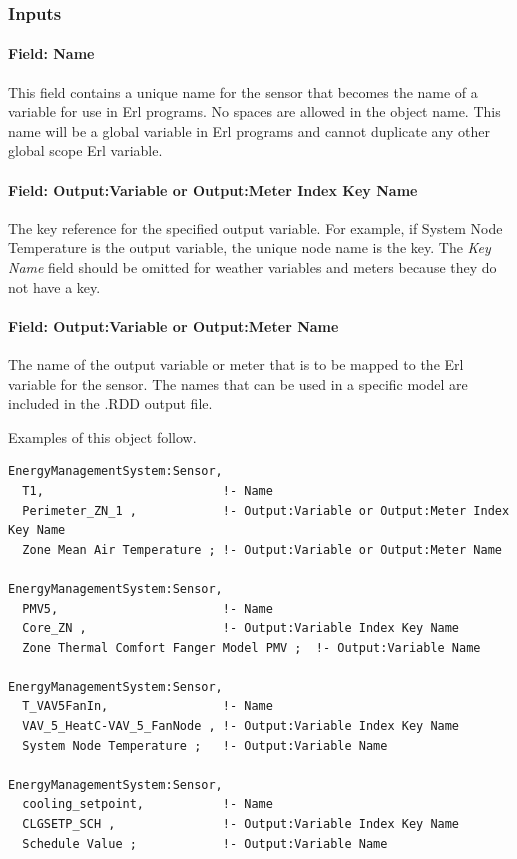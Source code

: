 \subsubsection{Inputs}\label{inputs-015}

\paragraph{Field: Name}\label{field-name-014}

This field contains a unique name for the sensor that becomes the name of a variable for use in Erl programs. No spaces are allowed in the object name. This name will be a global variable in Erl programs and cannot duplicate any other global scope Erl variable.

\paragraph{Field: Output:Variable or Output:Meter Index Key Name}\label{field-outputvariable-or-outputmeter-index-key-name}

The key reference for the specified output variable. For example, if System Node Temperature is the output variable, the unique node name is the key. The \emph{Key Name} field should be omitted for weather variables and meters because they do not have a key.

\paragraph{Field: Output:Variable or Output:Meter Name}\label{field-outputvariable-or-outputmeter-name}

The name of the output variable or meter that is to be mapped to the Erl variable for the sensor. The names that can be used in a specific model are included in the .RDD output file.

Examples of this object follow.

\begin{lstlisting}
EnergyManagementSystem:Sensor,
  T1,                         !- Name
  Perimeter_ZN_1 ,            !- Output:Variable or Output:Meter Index Key Name
  Zone Mean Air Temperature ; !- Output:Variable or Output:Meter Name

EnergyManagementSystem:Sensor,
  PMV5,                       !- Name
  Core_ZN ,                   !- Output:Variable Index Key Name
  Zone Thermal Comfort Fanger Model PMV ;  !- Output:Variable Name

EnergyManagementSystem:Sensor,
  T_VAV5FanIn,                !- Name
  VAV_5_HeatC-VAV_5_FanNode , !- Output:Variable Index Key Name
  System Node Temperature ;   !- Output:Variable Name

EnergyManagementSystem:Sensor,
  cooling_setpoint,           !- Name
  CLGSETP_SCH ,               !- Output:Variable Index Key Name
  Schedule Value ;            !- Output:Variable Name
\end{lstlisting}

